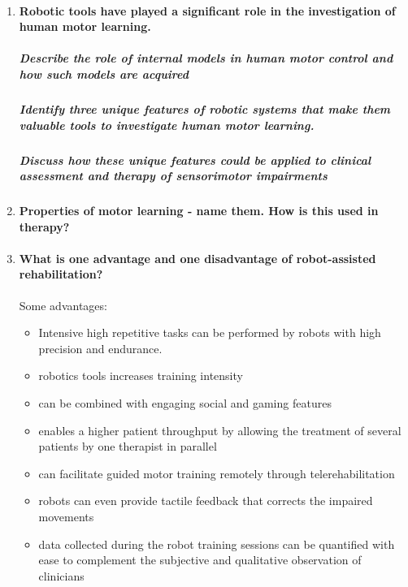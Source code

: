 \documentclass[12pt,article,oneside,a4paper]{memoir}
\begin{document}
\begin{enumerate}
\item \paragraph{Robotic tools have played a significant role in the investigation of human motor learning.}

\subparagraph{Describe the role of internal models in human motor control and
how such models are acquired}


\subparagraph{Identify three unique features of robotic systems that make them
valuable tools to investigate human motor learning.}


\subparagraph{Discuss how these unique features could be applied to clinical
assessment and therapy of sensorimotor impairments} 


\item \paragraph{Properties of motor learning - name them.  How is this used in therapy?}

\item \paragraph{What is one advantage and one disadvantage of robot-assisted
rehabilitation?}
Some advantages:
\begin{itemize}
\item Intensive high repetitive tasks can be performed by robots with high
precision and endurance.
\item robotics tools increases training intensity
\item can be combined with engaging social and gaming features
\item enables a higher patient throughput by allowing the treatment of several
patients by one therapist in parallel
\item can facilitate guided motor training remotely through telerehabilitation
\item robots can even provide tactile feedback that corrects the impaired
movements
\item data collected during the robot training sessions can be quantified with
ease to complement the subjective and qualitative observation of clinicians
\end{itemize}


\end{enumerate}
\end{document}
